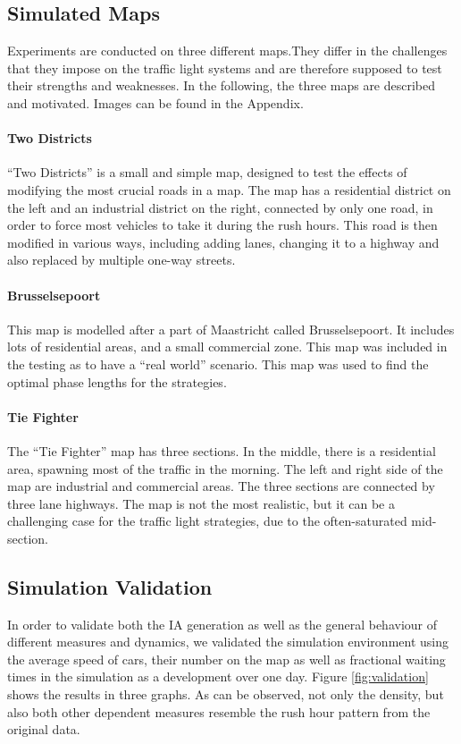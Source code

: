 \documentclass[11pt]{article}
\begin{document}
\subsection{Simulated Maps}
Experiments are conducted on three different maps.They differ in the challenges that they impose on the traffic light systems and are therefore supposed to test their strengths and weaknesses. In the following, the three maps are described and motivated. Images can be found in the Appendix.

\paragraph{Two Districts} “Two Districts” is a small and simple map, designed to test the effects of modifying the most crucial roads in a map. The map has a residential district on the left and an industrial district on the right, connected by only one road, in order to force most vehicles to take it during the rush hours. This road is then modified in various ways, including adding lanes, changing it to a highway and also replaced by multiple one-way streets. 

\paragraph{Brusselsepoort} This map is modelled after a part of Maastricht called Brusselsepoort. It includes lots of residential areas, and a small commercial zone. This map was included in the testing as to have a “real world” scenario. This map was used to find the optimal phase lengths for the strategies.

\paragraph{Tie Fighter} The “Tie Fighter” map has three sections. In the middle, there is a residential area, spawning most of the traffic in the morning. The left and right side of the map are industrial and commercial areas. The three sections are connected by three lane highways. The map is not the most realistic, but it can be a challenging case for the traffic light strategies, due to the often-saturated mid-section.

\subsection{Simulation Validation}
In order to validate both the IA generation as well as the general behaviour of different measures and dynamics, we validated the simulation environment using the average speed of cars, their number on the map as well as fractional waiting times in the simulation as a development over one day. Figure \ref{fig:validation} shows the results in three graphs. As can be observed, not only the density, but also both other dependent measures resemble the rush hour pattern from the original data.
\end{document}
